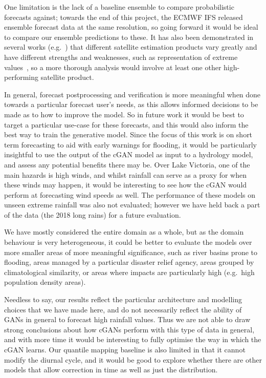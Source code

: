 \documentclass{article}
\begin{document}

One limitation is the lack of a baseline ensemble to compare probabilistic forecasts against; towards the end of this project, the ECMWF IFS released ensemble forecast data at the same resolution, so going forward it would be ideal to compare our ensemble predictions to these. It has also been demonstrated in several works (e.g.~\cite{ageet_validation_2022}) that different satellite estimation products vary greatly and have different strengths and weaknesses, such as representation of extreme values~\citep{chapman_climate_2022}, so a more thorough analysis would involve at least one other high-performing satellite product.
 
In general, forecast postprocessing and verification is more meaningful when done towards a particular forecast user's needs, as this allows informed decisions to be made as to how to improve the model. So in future work it would be best to target a particular use-case for these forecasts, and this would also inform the best way to train the generative model. Since the focus of this work is on short term forecasting to aid with early warnings for flooding, it would be particularly insightful to use the output of the cGAN model as input to a hydrology model, and assess any potential benefits there may be. Over Lake Victoria, one of the main hazards is high winds, and whilst rainfall can serve as a proxy for when these winds may happen, it would be interesting to see how the cGAN would perform at forecasting wind speeds as well. The performance of these models on unseen extreme rainfall was also not evaluated; however we have held back a part of the data (the 2018 long rains) for a future evaluation.

We have mostly considered the entire domain as a whole, but as the domain behaviour is very heterogeneous, it could be better to evaluate the models over more smaller areas of more meaningful significance, such as river basins prone to flooding, areas managed by a particular disaster relief agency, areas grouped by climatological similarity, or areas where impacts are particularly high (e.g.~high population density areas). 

Needless to say, our results reflect the particular architecture and modelling choices that we have made here, and do not necessarily reflect the ability of GANs in general to forecast high rainfall values. Thus we are not able to draw strong conclusions about how cGANs perform with this type of data in general, and with more time it would be interesting to fully optimise the way in which the cGAN learns. Our quantile mapping baseline is also limited in that it cannot modify the diurnal cycle, and it would be good to explore whether there are other models that allow correction in time as well as just the distribution.
\end{document}
